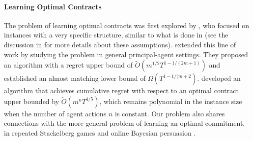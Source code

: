 \paragraph{Learning Optimal Contracts} The problem of learning optimal contracts was first explored by \citet{ho2014adaptive}, who focused on instances with a very specific structure, similar to what is done in \citet{cohen2022learning} (see the discussion in \citet{zhu2022online} for more details about these assumptions). \citet{zhu2022online} extended this line of work by studying the problem in general principal-agent settings. They proposed an algorithm with a regret upper bound of $\widetilde O(m^{1/2} T^{1-1/(2m+1)})$ and established an almost matching lower bound of $\Omega(T^{1-1/(m+2})$. \citet{bacchiocchi2023learning} developed an algorithm that achieves cumulative regret with respect to an optimal contract upper bounded by $\widetilde O(m^n T^{4/5})$, which remains polynomial in the instance size when the number of agent actions $n$ is constant.
%
Our problem also shares connections with the more general problem of learning an optimal commitment, in repeated Stackelberg games \cite{letchford2009learning,peng2019learning,blum2014learning,balcan2015commitment} and online Bayesian persuasion \cite{castiglioni2020online,castiglioni2021multi,bernasconi2023optimal}.



